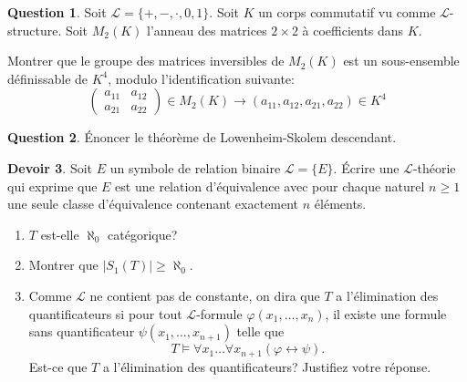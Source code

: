 \documentclass[a4paper, 12pt]{article}
\theoremstyle{definition} \newtheorem{quest}{Question}
\theoremstyle{definition} \newtheorem{dev}[quest]{Devoir}
\begin{document}
\begin{quest}
  Soit $\mathscr L=\{+, -, \cdot, 0, 1\}$.
  Soit $K$ un corps commutatif vu comme $\mathscr L$-structure.
  Soit $M_2(K)$ l'anneau des matrices $2\times 2$ à coefficients
  dans $K$.

  Montrer que le groupe des matrices inversibles de $M_2(K)$
  est un sous-ensemble définissable de $K^4$, modulo
  l'identification suivante:
  \begin{equation*}
    \left( \begin{matrix}
        a_{1 1} & a_{1 2} \\
        a_{2 1} & a_{2 2}
      \end{matrix} \right)\in M_2(K)
    \rightarrow (a_{1 1}, a_{1 2}, a_{2 1}, a_{2 2}) \in K^4
  \end{equation*}
\end{quest}

\begin{quest}
  \'{E}noncer le théorème de Lowenheim-Skolem descendant.
\end{quest}

\begin{dev}
  Soit $E$ un symbole de relation binaire $\mathscr L= \{E\}$.
  \'{E}crire une $\mathscr L$-théorie qui exprime que $E$ est
  une relation d'équivalence avec pour chaque naturel $n\geq 1$
  une seule classe d'équivalence contenant exactement $n$ éléments.
  \begin{enumerate}
  \item $T$ est-elle $\aleph_0$ catégorique?
  \item Montrer que $|S_1(T)|\geq \aleph_0$.
  \item Comme $\mathscr L$ ne contient pas de constante,
    on dira que $T$ a l'élimination des quantificateurs
    si pour tout $\mathscr L$-formule $\varphi(x_1, \ldots, x_n)$,
    il existe une formule sans quantificateur
    $\psi(x_1, \ldots, x_{n+1})$ telle que
    $$T\models \forall x_1 \ldots \forall x_{n+1}
    (\varphi\leftrightarrow \psi).$$
    Est-ce que $T$ a l'élimination des quantificateurs? Justifiez
    votre réponse.
  \end{enumerate}
\end{dev}
\end{document}
